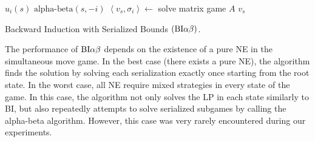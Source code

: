 \begin{algorithm2e}[t]
\small
{}
 {\Return $u_i(s)$} \label{alg:biab:stop1}
 {\Return $\textrm{alpha-beta}(s,-i)$} \label{alg:biab:stop15}
$\left\langle v_s, \sigma_i \right\rangle \leftarrow$ solve matrix game $A$\;
\Return $v_s$ \label{alg:biab:stop2}
\caption{Backward Induction with Serialized Bounds $(\textrm{BI}\alpha\beta)$.}\label{alg:backwardinduction-ab}
\end{algorithm2e}

The performance of $\textrm{BI}\alpha\beta$ depends on the existence of a pure NE in the simultaneous move game.
In the best case (\ie there exists a pure NE), the algorithm finds the solution by solving each serialization exactly once starting from the root state.
In the worst case, all NE require mixed strategies in every state of the game.
In this case, the algorithm not only solves the LP in each state similarly to BI, but also repeatedly attempts to solve serialized subgames by calling the alpha-beta algorithm.
However, this case was very rarely encountered during our experiments.


